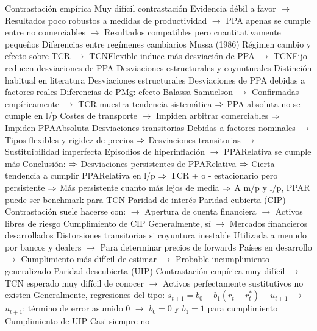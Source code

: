 \documentclass{nuevotema}
\begin{document}
\begin{esquemal}
				\4 Contrastación empírica
				\4[] Muy difícil contrastación
				\4[] Evidencia débil a favor
				\4[] $\to$ Resultados poco robustos a medidas de productividad
				\4[] $\to$ PPA apenas se cumple entre no comerciables
				\4[] $\to$ Resultados compatibles pero cuantitativamente pequeños
			\3 Diferencias entre regímenes cambiarios
				\4 Mussa (1986)
				\4[] Régimen cambio y efecto sobre TCR
				\4[] $\to$ TCNFlexible induce más desviación de PPA
				\4[] $\to$ TCNFijo reducen desviaciones de PPA
			\3 Desviaciones estructurales y coyunturales
				\4 Distinción habitual en literatura
				\4 Desviaciones estructurales
				\4[] Desviaciones de PPA debidas a factores reales
				\4[] Diferencias de PMg: efecto Balassa-Samuelson
				\4[] $\to$ Confirmadas empíricamente
				\4[] $\to$ TCR muestra tendencia sistemática
				\4[] $\Rightarrow$ PPA absoluta no se cumple en l/p
				\4[] Costes de transporte
				\4[] $\to$ Impiden arbitrar comerciables
				\4[] $\Rightarrow$ Impiden PPAAbsoluta
				\4 Desviaciones transitorias
				\4[] Debidas a factores nominales
				\4[] $\to$ Tipos flexibles y rigidez de precios
				\4[] $\Rightarrow$ Desviaciones transitorias
				\4[] $\to$ Sustituibilidad imperfecta
				\4[] Episodios de hiperinflación
				\4[] $\to$ PPARelativa se cumple más
				\4[] Conclusión:
				\4[] $\Rightarrow$ Desviaciones persistentes de PPARelativa
				\4[] $\Rightarrow$ Cierta tendencia a cumplir PPARelativa en l/p
				\4[] $\Rightarrow$ TCR + o - estacionario pero persistente
				\4[] $\Rightarrow$ Más persistente cuanto más lejos de media
				\4[] $\Rightarrow$ A m/p y l/p, PPAR puede ser benchmark para TCN
		\2 Paridad de interés
			\3 Paridad cubierta (CIP)
				\4 Contrastación suele hacerse con:
				\4[] $\to$ Apertura de cuenta financiera
				\4[] $\to$ Activos libres de riesgo
				\4 Cumplimiento de CIP
				\4[] Generalmente, sí
				\4[] $\to$ Mercados financieros desarrollados
				\4[] Distorsiones transitorias si coyuntura inestable
				\4[] Utilizada a menudo por bancos y dealers
				\4[] $\to$ Para determinar precios de forwards
				\4[] Países en desarrollo
				\4[] $\to$ Cumplimiento más difícil de estimar
				\4[] $\to$ Probable incumplimiento generalizado
			\3 Paridad descubierta (UIP)
				\4 Contrastación empírica muy difícil
				\4[] $\to$ TCN esperado muy difícil de conocer
				\4[] $\to$ Activos perfectamente sustitutivos no existen
				\4[] Generalmente, regresiones del tipo:
				\4[] $s_{t+1} = b_0 + b_1 (r_t - r_t^*) + u_{t+1}$
				\4[] $\to$ $u_{t+1}$: término de error asumido 0
				\4[] $\to$ $b_0 = 0$ y $b_1 = 1$ para cumplimiento
				\4 Cumplimiento de UIP
				\4[] Casi siempre no

\end{esquemal}
\end{document}
